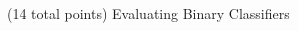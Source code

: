 \documentclass[12pt]{article}
\begin{document}
\begin{question}{(14 total points) Evaluating Binary Classifiers}
\begin{subquestion}
\begin{answerbox}{35em}





\end{answerbox}



\end{subquestion}

\end{question}
\end{document}
